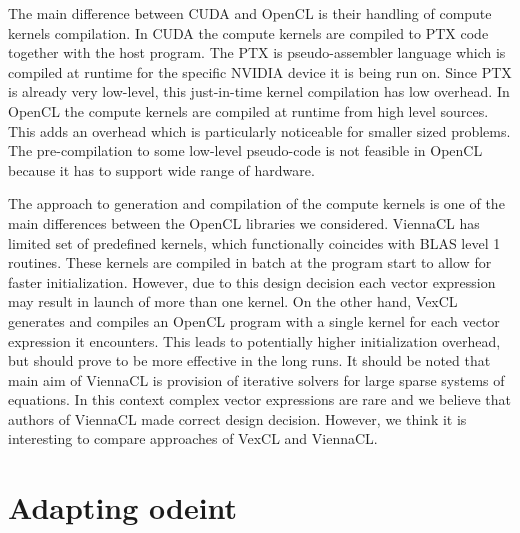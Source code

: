 \documentclass[1p]{elsarticle}
\begin{document}
The main difference between CUDA and OpenCL is their handling of compute
kernels compilation. In CUDA the compute kernels are compiled to PTX code
together with the host program. The PTX is pseudo-assembler language which is
compiled at runtime for the specific NVIDIA device it is being run on. Since
PTX is already very low-level, this just-in-time kernel compilation has low
overhead. In OpenCL the compute kernels are compiled at runtime from high level
sources. This adds an overhead which is particularly noticeable for smaller
sized problems. The pre-compilation to some low-level pseudo-code is not
feasible in OpenCL because it has to support wide range of hardware.

The approach to generation and compilation of the compute kernels is one of the
main differences between the OpenCL libraries we considered.  ViennaCL has
limited set of predefined kernels, which functionally coincides with BLAS level
1 routines.  These kernels are compiled in batch at the program start to allow
for faster initialization. However, due to this design decision each vector
expression may result in launch of more than one kernel.  On the other hand,
VexCL generates and compiles an OpenCL program with a single kernel for each
vector expression it encounters.  This leads to potentially higher
initialization overhead, but should prove to be more effective in the long
runs. It should be noted that main aim of ViennaCL is provision of iterative
solvers for large sparse systems of equations. In this context complex vector
expressions are rare and we believe that authors of ViennaCL made correct
design decision.  However, we think it is interesting to compare approaches of
VexCL and ViennaCL.






%
%
\section{Adapting odeint}
\end{document}
